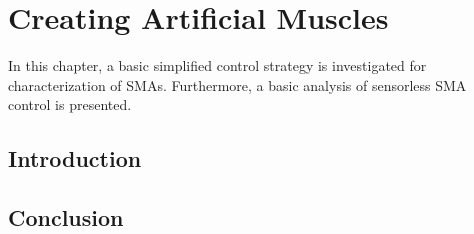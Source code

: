 
\chapter{Creating Artificial Muscles}
In this chapter, a basic simplified control strategy is investigated for characterization of SMAs. Furthermore, a basic analysis of sensorless SMA control is presented.
\section{Introduction}
\section{Conclusion}
